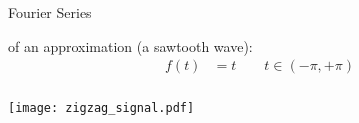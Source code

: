 \begin{frame}[t]{Fourier Series}

    \myExample of an approximation (a sawtooth wave):
    {\scriptsize
    \begin{align*}
        f(t) & = t \quad\quad t \in \left(-\pi,+\pi\right) \\
    \end{align*}}%

    \vspace{-0.5cm}
    \begin{center}
        \texttt{[image: zigzag\_signal.pdf]}
    \end{center}
\end{frame}

